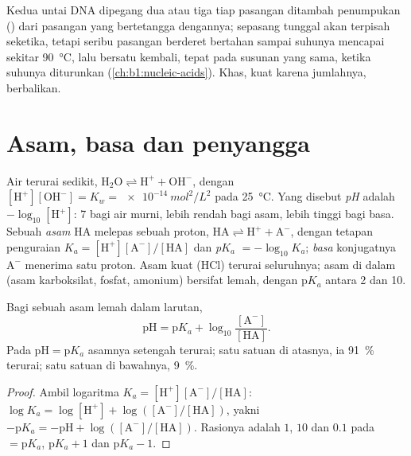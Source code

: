 \begin{example}\label{ex:b1:water-small-molecules:melting}
Kedua untai DNA dipegang dua atau tiga  tiap pasangan
 ditambah penumpukan () dari pasangan yang
bertetangga dengannya;
sepasang tunggal akan terpisah seketika, tetapi seribu pasangan
berderet bertahan sampai suhunya mencapai sekitar \qty{90}{\celsius},
lalu bersatu kembali, tepat pada susunan yang sama, ketika suhunya
diturunkan (\cref{ch:b1:nucleic-acids}). Khas, kuat karena jumlahnya,
berbalikan.
\end{example}

\section{Asam, basa dan penyangga}

\begin{definition}\label{def:b1:water-small-molecules:ph}
Air terurai sedikit, $\mathrm{H_2O} \rightleftharpoons
\mathrm{H^+} + \mathrm{OH^-}$, dengan $[\mathrm{H^+}][\mathrm{OH^-}] =
K_w = \qty{e-14}{mol^2/L^2}$ pada \qty{25}{\celsius}. Yang disebut
\emph{pH} adalah $-\log_{10}[\mathrm{H^+}]$: 7 bagi air murni,
lebih rendah bagi asam, lebih tinggi bagi basa. Sebuah
\emph{asam} $\mathrm{HA}$ melepas sebuah proton,
$\mathrm{HA} \rightleftharpoons \mathrm{H^+} +
\mathrm{A^-}$, dengan tetapan penguraian $K_a =
[\mathrm{H^+}][\mathrm{A^-}]/[\mathrm{HA}]$ dan
\emph{p$K_a$} $= -\log_{10}K_a$; \emph{basa}
konjugatnya $\mathrm{A^-}$ menerima satu proton. Asam kuat (HCl) terurai
seluruhnya; asam di dalam  (asam karboksilat, fosfat, amonium)
bersifat lemah, dengan p$K_a$ antara 2 dan 10.
\end{definition}

\begin{theorem}\label{thm:b1:water-small-molecules:hh}
Bagi sebuah asam lemah dalam larutan,
\[
\mathrm{pH} = \mathrm{p}K_a + \log_{10}\frac{[\mathrm{A^-}]}{[\mathrm{HA}]} .
\]
Pada $\mathrm{pH} = \mathrm{p}K_a$ asamnya setengah terurai; satu satuan
 di atasnya, ia \qty{91}{\%} terurai; satu satuan di bawahnya, \qty{9}{\%}.
\end{theorem}
\begin{proof}
Ambil logaritma $K_a = [\mathrm{H^+}][\mathrm{A^-}]/[\mathrm{HA}]$:
$\log K_a = \log[\mathrm{H^+}] + \log([\mathrm{A^-}]/[\mathrm{HA}])$,
yakni $-\mathrm{p}K_a = -\mathrm{pH} + \log([\mathrm{A^-}]/[\mathrm{HA}])$.
Rasionya adalah $1$, $10$ dan $0.1$ pada  $= \mathrm{p}K_a$, $\mathrm{p}K_a + 1$
dan $\mathrm{p}K_a - 1$.
\end{proof}


